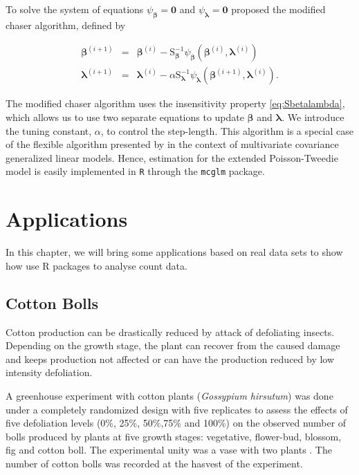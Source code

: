 \documentclass[9pt,a5paper,]{book}
\theoremstyle{definition}
\theoremstyle{definition}
\theoremstyle{remark}
\begin{document}
To solve the system of equations
\(\psi_{\boldsymbol{\beta}} = \boldsymbol{0}\) and
\(\psi_{\boldsymbol{\lambda}} = \boldsymbol{0}\) \citet{Jorgensen2004}
proposed the modified chaser algorithm, defined by

\begin{eqnarray*}
\label{chaser}
\boldsymbol{\beta}^{(i+1)} &=& \boldsymbol{\beta}^{(i)} - \mathrm{S}_{\boldsymbol{\beta}}^{-1} \psi_{\boldsymbol{\beta}}(\boldsymbol{\beta}^{(i)}, \boldsymbol{\lambda}^{(i)}) \nonumber \\
\boldsymbol{\lambda}^{(i+1)} &=& \boldsymbol{\lambda}^{(i)} - \alpha \mathrm{S}_{\boldsymbol{\lambda}}^{-1} \psi_{\boldsymbol{\lambda}}(\boldsymbol{\beta}^{(i+1)}, \boldsymbol{\lambda}^{(i)}).
\end{eqnarray*}

The modified chaser algorithm uses the insensitivity property
\eqref{eq:Sbetalambda}, which allows us to use two separate equations to
update \(\boldsymbol{\beta}\) and \(\boldsymbol{\lambda}\). We introduce
the tuning constant, \(\alpha\), to control the step-length. This
algorithm is a special case of the flexible algorithm presented by
\citet{Bonat2016a} in the context of multivariate covariance generalized
linear models. Hence, estimation for the extended Poisson-Tweedie model
is easily implemented in \texttt{R} through the \texttt{mcglm}
\citep{Bonat2016c} package.

\chapter{Applications}\label{applications}

In this chapter, we will bring some applications based on real data sets
to show how use R packages to analyse count data.

\section{Cotton Bolls}\label{cotton-bolls}

Cotton production can be drastically reduced by attack of defoliating
insects. Depending on the growth stage, the plant can recover from the
caused damage and keeps production not affected or can have the
production reduced by low intensity defoliation.

A greenhouse experiment with cotton plants (\emph{Gossypium hirsutum})
was done under a completely randomized design with five replicates to
assess the effects of five defoliation levels (0\%, 25\%, 50\%,75\% and
100\%) on the observed number of bolls produced by plants at five growth
stages: vegetative, flower-bud, blossom, fig and cotton boll. The
experimental unity was a vase with two plants \citep[for
more]{Silva2012a}. The number of cotton bolls was recorded at the
hasvest of the experiment.
\end{document}
